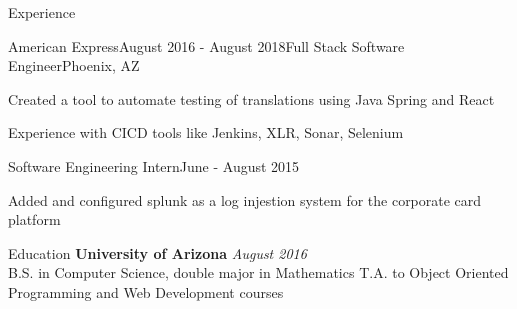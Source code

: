 \documentclass{resume} %
\begin{document}
\begin{rSection}{Experience}
\begin{rSubsection}{American Express}{August 2016 - August 2018}{Full Stack Software Engineer}{Phoenix, AZ}
\item Created a tool to automate testing of translations using Java Spring and React
\item Experience with CICD tools like Jenkins, XLR, Sonar, Selenium
\end{rSubsection}

\begin{rSubsection}{}{}{Software Engineering Intern}{June - August 2015}
\item Added and configured splunk as a log injestion system for the corporate card platform

\end{rSubsection}

\end{rSection}

\begin{rSection}{Education}
	{\bf\large University of Arizona} \hfill {\em\large August 2016} \\
	\large B.S. in Computer Science, double major in Mathematics
	\smallskip T.A. to Object Oriented Programming and Web Development courses
\end{rSection}
\end{document}
